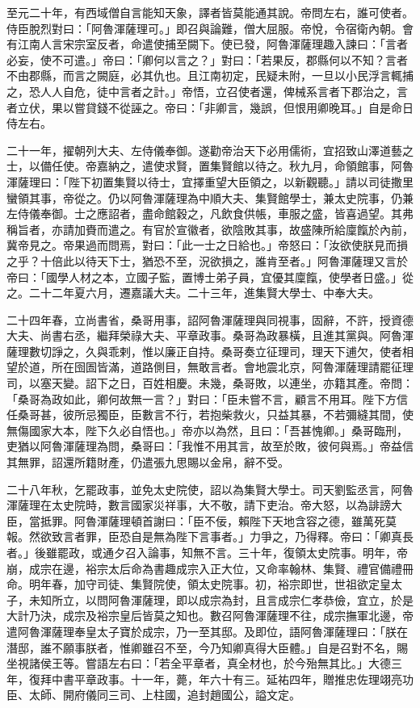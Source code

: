 \begin{pinyinscope}
 至元二十年，有西域僧自言能知天象，譯者皆莫能通其說。帝問左右，誰可使者。侍臣脫烈對曰：「阿魯渾薩理可。」即召與論難，僧大屈服。帝悅，令宿衛內朝。會有江南人言宋宗室反者，命遣使捕至闕下。使已發，阿魯渾薩理趣入諫曰：「言者必妄，使不可遣。」帝曰：「卿何以言之？」對曰：「若果反，郡縣何以不知？言者不由郡縣，而言之闕庭，必其仇也。且江南初定，民疑未附，一旦以小民浮言輒捕之，恐人人自危，徒中言者之計。」帝悟，立召使者還，俾械系言者下郡治之，言者立伏，果以嘗貸錢不從誣之。帝曰：「非卿言，幾誤，但恨用卿晚耳。」自是命日侍左右。



 二十一年，擢朝列大夫、左侍儀奉御。遂勸帝治天下必用儒術，宜招致山澤道藝之士，以備任使。帝嘉納之，遣使求賢，置集賢館以待之。秋九月，命領館事，阿魯渾薩理曰：「陛下初置集賢以待士，宜擇重望大臣領之，以新觀聽。」請以司徒撒里蠻領其事，帝從之。仍以阿魯渾薩理為中順大夫、集賢館學士，兼太史院事，仍兼左侍儀奉御。士之應詔者，盡命館穀之，凡飲食供帳，車服之盛，皆喜過望。其弗稱旨者，亦請加賚而遣之。有官於宣徽者，欲陰敗其事，故盛陳所給廩餼於內前，冀帝見之。帝果過而問焉，對曰：「此一士之日給也。」帝怒曰：「汝欲使朕見而損之乎？十倍此以待天下士，猶恐不至，況欲損之，誰肯至者。」阿魯渾薩理又言於帝曰：「國學人材之本，立國子監，置博士弟子員，宜優其廩餼，使學者日盛。」從之。二十二年夏六月，遷嘉議大夫。二十三年，進集賢大學士、中奉大夫。



 二十四年春，立尚書省，桑哥用事，詔阿魯渾薩理與同視事，固辭，不許，授資德大夫、尚書右丞，繼拜榮祿大夫、平章政事。桑哥為政暴橫，且進其黨與。阿魯渾薩理數切諍之，久與乖剌，惟以廉正自持。桑哥奏立征理司，理天下逋欠，使者相望於道，所在囹圄皆滿，道路側目，無敢言者。會地震北京，阿魯渾薩理請罷征理司，以塞天變。詔下之日，百姓相慶。未幾，桑哥敗，以連坐，亦籍其產。帝問：「桑哥為政如此，卿何故無一言？」對曰：「臣未嘗不言，顧言不用耳。陛下方信任桑哥甚，彼所忌獨臣，臣數言不行，若抱柴救火，只益其暴，不若彌縫其間，使無傷國家大本，陛下久必自悟也。」帝亦以為然，且曰：「吾甚愧卿。」桑哥臨刑，吏猶以阿魯渾薩理為問，桑哥曰：「我惟不用其言，故至於敗，彼何與焉。」帝益信其無罪，詔還所籍財產，仍遣張九思賜以金帛，辭不受。



 二十八年秋，乞罷政事，並免太史院使，詔以為集賢大學士。司天劉監丞言，阿魯渾薩理在太史院時，數言國家災祥事，大不敬，請下吏治。帝大怒，以為誹謗大臣，當抵罪。阿魯渾薩理頓首謝曰：「臣不佞，賴陛下天地含容之德，雖萬死莫報。然欲致言者罪，臣恐自是無為陛下言事者。」力爭之，乃得釋。帝曰：「卿真長者。」後雖罷政，或通夕召入論事，知無不言。三十年，復領太史院事。明年，帝崩，成宗在邊，裕宗太后命為書趣成宗入正大位，又命率翰林、集賢、禮官備禮冊命。明年春，加守司徒、集賢院使，領太史院事。初，裕宗即世，世祖欲定皇太子，未知所立，以問阿魯渾薩理，即以成宗為封，且言成宗仁孝恭儉，宜立，於是大計乃決，成宗及裕宗皇后皆莫之知也。數召阿魯渾薩理不往，成宗撫軍北邊，帝遣阿魯渾薩理奉皇太子寶於成宗，乃一至其邸。及即位，語阿魯渾薩理曰：「朕在潛邸，誰不願事朕者，惟卿雖召不至，今乃知卿真得大臣體。」自是召對不名，賜坐視諸侯王等。嘗語左右曰：「若全平章者，真全材也，於今殆無其比。」大德三年，復拜中書平章政事。十一年，薨，年六十有三。延祐四年，贈推忠佐理翊亮功臣、太師、開府儀同三司、上柱國，追封趙國公，謚文定。




\end{pinyinscope}

